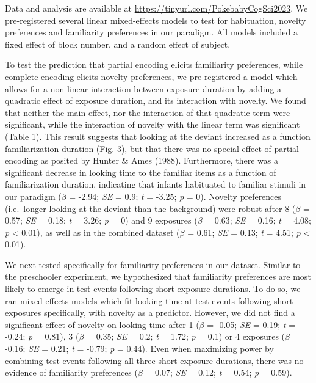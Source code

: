 \documentclass[10pt, letterpaper]{article}
\begin{document}
Data and analysis are available at
\url{https://tinyurl.com/PokebabyCogSci2023}. We pre-registered several
linear mixed-effects models to test for habituation, novelty preferences
and familiarity preferences in our paradigm. All models included a fixed
effect of block number, and a random effect of subject.

To test the prediction that partial encoding elicits familiarity
preferences, while complete encoding elicits novelty preferences, we
pre-registered a model which allows for a non-linear interaction between
exposure duration by adding a quadratic effect of exposure duration, and
its interaction with novelty. We found that neither the main effect, nor
the interaction of that quadratic term were significant, while the
interaction of novelty with the linear term was significant (Table 1).
This result suggests that looking at the deviant increased as a function
familiarization duration (Fig. 3), but that there was no special effect
of partial encoding as posited by Hunter \& Ames (1988). Furthermore,
there was a significant decrease in looking time to the familiar items
as a function of familiarization duration, indicating that infants
habituated to familiar stimuli in our paradigm (\(\beta\) = -2.94;
\emph{SE} = 0.9; \emph{t} = -3.25; \emph{p} = 0). Novelty preferences
(i.e.~longer looking at the deviant than the background) were robust
after 8 (\(\beta\) = 0.57; \emph{SE} = 0.18; \emph{t} = 3.26; \emph{p} =
0) and 9 exposures (\(\beta\) = 0.63; \emph{SE} = 0.16; \emph{t} = 4.08;
\emph{p} \textless{} 0.01), as well as in the combined dataset
(\(\beta\) = 0.61; \emph{SE} = 0.13; \emph{t} = 4.51; \emph{p}
\textless{} 0.01).

We next tested specifically for familiarity preferences in our dataset.
Similar to the preschooler experiment, we hypothesized that familiarity
preferences are most likely to emerge in test events following short
exposure durations. To do so, we ran mixed-effects models which fit
looking time at test events following short exposures specifically, with
novelty as a predictor. However, we did not find a significant effect of
novelty on looking time after 1 (\(\beta\) = -0.05; \emph{SE} = 0.19;
\emph{t} = -0.24; \emph{p} = 0.81), 3 (\(\beta\) = 0.35; \emph{SE} =
0.2; \emph{t} = 1.72; \emph{p} = 0.1) or 4 exposures (\(\beta\) = -0.16;
\emph{SE} = 0.21; \emph{t} = -0.79; \emph{p} = 0.44). Even when
maximizing power by combining test events following all three short
exposure durations, there was no evidence of familiarity preferences
(\(\beta\) = 0.07; \emph{SE} = 0.12; \emph{t} = 0.54; \emph{p} = 0.59).
\end{document}
